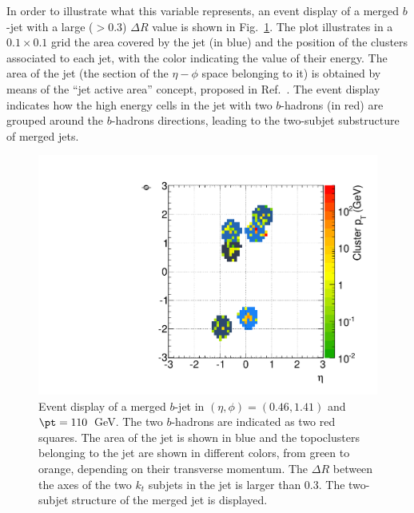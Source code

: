 In order to illustrate what this variable represents, an event display of a merged $b$-jet with a large  ($>0.3$) $\Delta R$  %
value is shown in Fig.~\ref{fig:ED}.  
The plot illustrates in a $0.1 \times 0.1$ grid the area covered by the jet (in blue) and the position of the clusters associated to each jet, with the color indicating the value of their energy. The area of the jet (the section of the $\eta - \phi$  space belonging to it) is obtained by means of the ``jet active area'' concept, proposed in Ref.~\cite{CatchmentArea}.
 The event display indicates how the high energy cells in the jet with two $b$-hadrons (in red) are grouped around the $b$-hadrons directions, leading to the two-subjet substructure of merged jets.

\begin{figure}[tp]
\centering
\includegraphics[width=1\textwidth]{FIGS/TEMPFigs/TESTEventDisplay2Cluster.pdf}
\caption{Event display of a merged $b$-jet in $(\eta,\phi)=(0.46,1.41)$ and $\pt = 110$~GeV. The two $b$-hadrons are indicated as two red squares. The area of the jet is shown in blue and the topoclusters belonging to the jet are shown in different colors, from green to orange, depending on their transverse momentum. The $\Delta R$ between the axes of the two $k_t$ subjets in the jet is larger than 0.3. The two-subjet structure of the merged jet is displayed.}
\label{fig:ED}
\end{figure}

